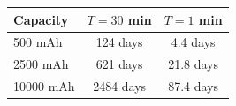 \begin{tabular}{lcc}
\hline
\textbf{Capacity} & \textbf{$T=30$ min} & \textbf{$T=1$ min} \\
\hline
500 mAh & 124 days & 4.4 days \\
2500 mAh & 621 days & 21.8 days \\
10000 mAh & 2484 days & 87.4 days \\
\hline
\end{tabular}
